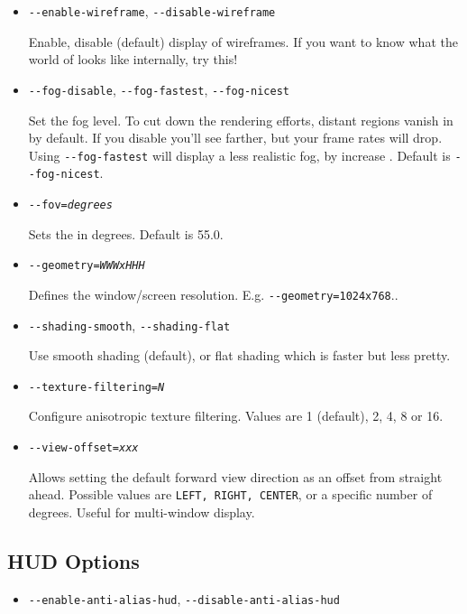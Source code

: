 {\begin{itemize}
Enable (default), disable use of textures.

\item{\texttt{-$ $-enable-wireframe}, \texttt{-$ $-disable-wireframe}}

Enable, disable (default) display of wireframes. If you want to know what the world of
\FlightGear{} looks like internally, try this!

\item{\texttt{-$ $-fog-disable}, \texttt{-$ $-fog-fastest}, \texttt{-$ $-fog-nicest}}

Set the fog level. To cut down the rendering efforts, distant regions vanish in  by default.
If you disable  you'll see farther, but your frame rates will drop. Using \texttt{-$ $-fog-fastest}
will display a less realistic fog, by increase . Default is \texttt{-$ $-fog-nicest}.

\item{\texttt{-$ $-fov={\it degrees}}}

Sets the  in degrees. Default is 55.0.

\item{\texttt{-$ $-geometry={\it WWWxHHH}}}

Defines the window/screen resolution. E.g. \texttt{-$ $-geometry=1024x768}..

\item{\texttt{-$ $-shading-smooth}, \texttt{-$ $-shading-flat}}

Use smooth shading (default), or flat shading which is faster but less pretty.

\item{\texttt{-$ $-texture-filtering={\it N}}}

Configure anisotropic texture filtering. Values are 1 (default), 2, 4, 8 or 16.

\item{\texttt{-$ $-view-offset={\it xxx}}}

Allows setting the default forward view direction as an offset from straight ahead.
Possible values are \texttt{LEFT, RIGHT, CENTER}, or a specific number of degrees.
Useful for multi-window display.
\end{itemize}

\subsection{HUD Options}
\begin{itemize}
\item{\texttt{-$ $-enable-anti-alias-hud}, \texttt{-$ $-disable-anti-alias-hud}}


\end{itemize}}
